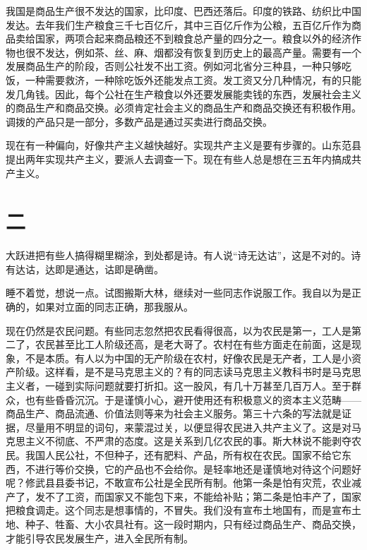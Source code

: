 我国是商品生产很不发达的国家，比印度、巴西还落后。印度的铁路、纺织比中国发达。去年我们生产粮食三千七百亿斤，其中三百亿斤作为公粮，五百亿斤作为商品卖给国家，两项合起来商品粮还不到粮食总产量的四分之一。粮食以外的经济作物也很不发达，例如茶、丝、麻、烟都没有恢复到历史上的最高产量。需要有一个发展商品生产的阶段，否则公社发不出工资。例如河北省分三种县，一种只够吃饭，一种需要救济，一种除吃饭外还能发点工资。发工资又分几种情况，有的只能发几角钱。因此，每个公社在生产粮食以外还要发展能卖钱的东西，发展社会主义的商品生产和商品交换。必须肯定社会主义的商品生产和商品交换还有积极作用。调拨的产品只是一部分，多数产品是通过买卖进行商品交换。

现在有一种偏向，好像共产主义越快越好。实现共产主义是要有步骤的。山东范县提出两年实现共产主义，要派人去调查一下。现在有些人总是想在三五年内搞成共产主义。

\section*{二}

大跃进把有些人搞得糊里糊涂，到处都是诗。有人说“诗无达诂”，这是不对的。诗有达诂，达即是通达，诂即是确凿。

睡不着觉，想说一点。试图搬斯大林，继续对一些同志作说服工作。我自以为是正确的，如果对立面的同志正确，那我服从。

现在仍然是农民问题。有些同志忽然把农民看得很高，以为农民是第一，工人是第二了，农民甚至比工人阶级还高，是老大哥了。农村在有些方面走在前面，这是现象，不是本质。有人以为中国的无产阶级在农村，好像农民是无产者，工人是小资产阶级。这样看，是不是马克思主义的？有的同志读马克思主义教科书时是马克思主义者，一碰到实际问题就要打折扣。这一股风，有几十万甚至几百万人。至于群众，也有些昏昏沉沉。于是谨慎小心，避开使用还有积极意义的资本主义范畴——商品生产、商品流通、价值法则等来为社会主义服务。第三十六条的写法就是证据，尽量用不明显的词句，来蒙混过关，以便显得农民进入共产主义了。这是对马克思主义不彻底、不严肃的态度。这是关系到几亿农民的事。斯大林说不能剥夺农民。我国人民公社，不但种子，还有肥料、产品，所有权在农民。国家不给它东西，不进行等价交换，它的产品也不会给你。是轻率地还是谨慎地对待这个问题好呢？修武县县委书记，不敢宣布公社是全民所有制。他第一条是怕有灾荒，农业减产了，发不了工资，而国家又不能包下来，不能给补贴；第二条是怕丰产了，国家把粮食调走。这个同志是想事情的，不冒失。我们没有宣布土地国有，而是宣布土地、种子、牲畜、大小农具社有。这一段时期内，只有经过商品生产、商品交换，才能引导农民发展生产，进入全民所有制。

